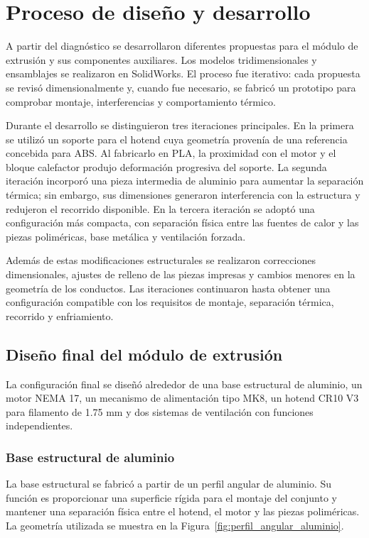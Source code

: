 \section{Proceso de diseño y desarrollo}
\label{sec:diseno_desarrollo}

A partir del diagnóstico se desarrollaron diferentes propuestas para el módulo de extrusión y sus componentes auxiliares. Los modelos tridimensionales y ensamblajes se realizaron en SolidWorks. El proceso fue iterativo: cada propuesta se revisó dimensionalmente y, cuando fue necesario, se fabricó un prototipo para comprobar montaje, interferencias y comportamiento térmico.

Durante el desarrollo se distinguieron tres iteraciones principales. En la primera se utilizó un soporte para el hotend cuya geometría provenía de una referencia concebida para ABS. Al fabricarlo en PLA, la proximidad con el motor y el bloque calefactor produjo deformación progresiva del soporte. La segunda iteración incorporó una pieza intermedia de aluminio para aumentar la separación térmica; sin embargo, sus dimensiones generaron interferencia con la estructura y redujeron el recorrido disponible. En la tercera iteración se adoptó una configuración más compacta, con separación física entre las fuentes de calor y las piezas poliméricas, base metálica y ventilación forzada.

Además de estas modificaciones estructurales se realizaron correcciones dimensionales, ajustes de relleno de las piezas impresas y cambios menores en la geometría de los conductos. Las iteraciones continuaron hasta obtener una configuración compatible con los requisitos de montaje, separación térmica, recorrido y enfriamiento.

\subsection{Diseño final del módulo de extrusión}
La configuración final se diseñó alrededor de una base estructural de aluminio, un motor NEMA 17, un mecanismo de alimentación tipo MK8, un hotend CR10 V3 para filamento de 1.75 mm y dos sistemas de ventilación con funciones independientes.
\subsubsection{Base estructural de aluminio}
La base estructural se fabricó a partir de un perfil angular de aluminio. Su función es proporcionar una superficie rígida para el montaje del conjunto y mantener una separación física entre el hotend, el motor y las piezas poliméricas. La geometría utilizada se muestra en la Figura~\ref{fig:perfil_angular_aluminio}.

